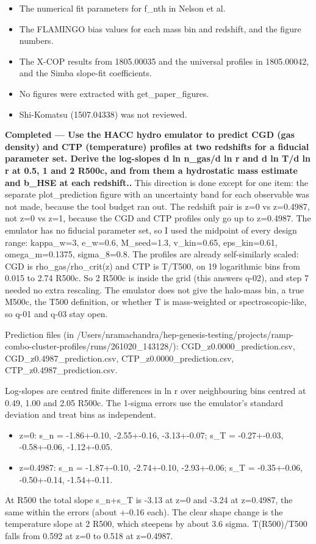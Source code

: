 \documentclass[11pt,a4paper]{article}
\begin{document}
\begin{itemize}
  \item The numerical fit parameters for f\_nth in Nelson et al.
  \item The FLAMINGO bias values for each mass bin and redshift, and the figure numbers.
  \item The X-COP results from 1805.00035 and the universal profiles in 1805.00042, and the Simba slope-fit coefficients.
  \item No figures were extracted with get\_paper\_figures.
  \item Shi-Komatsu (1507.04338) was not reviewed.
\end{itemize}
\textbf{Completed --- Use the HACC hydro emulator to predict CGD (gas density) and CTP (temperature) profiles at two redshifts for a fiducial parameter set. Derive the log-slopes d ln n\_gas/d ln r and d ln T/d ln r at 0.5, 1 and 2 R500c, and from them a hydrostatic mass estimate and b\_HSE at each redshift..} This direction is done except for one item: the separate plot\_prediction figure with an uncertainty band for each observable was not made, because the tool budget ran out. The redshift pair is z=0 vs z=0.4987, not z=0 vs z=1, because the CGD and CTP profiles only go up to z=0.4987. The emulator has no fiducial parameter set, so I used the midpoint of every design range: kappa\_w=3, e\_w=0.6, M\_seed=1.3, v\_kin=0.65, eps\_kin=0.61, omega\_m=0.1375, sigma\_8=0.8. The profiles are already self-similarly scaled: CGD is rho\_gas/rho\_crit(z) and CTP is T/T500, on 19 logarithmic bins from 0.015 to 2.74 R500c. So 2 R500c is inside the grid (this answers q-02), and step 7 needed no extra rescaling. The emulator does not give the halo-mass bin, a true M500c, the T500 definition, or whether T is mass-weighted or spectroscopic-like, so q-01 and q-03 stay open.

Prediction files (in /Users/nramachandra/hep-genesis-testing/projects/ramp-combo-cluster-profiles/runs/261020\_143128/): CGD\_z0.0000\_prediction.csv, CGD\_z0.4987\_prediction.csv, CTP\_z0.0000\_prediction.csv, CTP\_z0.4987\_prediction.csv.

Log-slopes are centred finite differences in ln r over neighbouring bins centred at 0.49, 1.00 and 2.05 R500c. The 1-sigma errors use the emulator's standard deviation and treat bins as independent.

\begin{itemize}
  \item z=0: s\_n = -1.86+-0.10, -2.55+-0.16, -3.13+-0.07; s\_T = -0.27+-0.03, -0.58+-0.06, -1.12+-0.05.
  \item z=0.4987: s\_n = -1.87+-0.10, -2.74+-0.10, -2.93+-0.06; s\_T = -0.35+-0.06, -0.50+-0.14, -1.54+-0.11.
\end{itemize}
At R500 the total slope s\_n+s\_T is -3.13 at z=0 and -3.24 at z=0.4987, the same within the errors (about +-0.16 each). The clear shape change is the temperature slope at 2 R500, which steepens by about 3.6 sigma. T(R500)/T500 falls from 0.592 at z=0 to 0.518 at z=0.4987.
\end{document}
